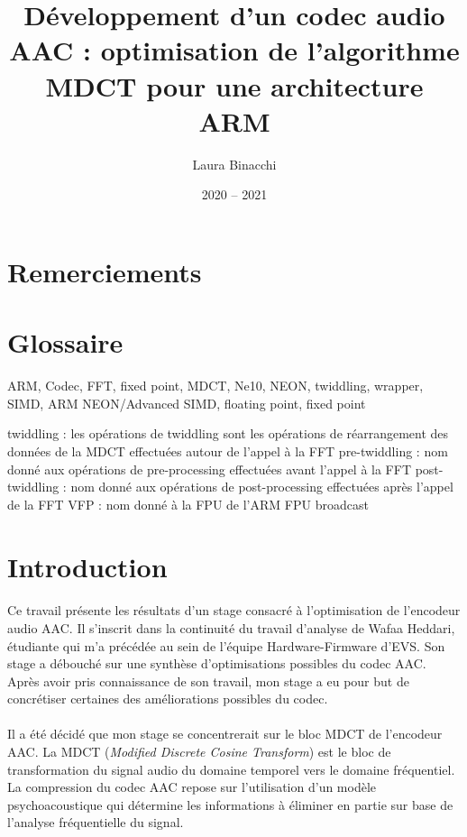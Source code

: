 \documentclass{article}
\title{Développement d'un codec audio AAC : optimisation de l'algorithme MDCT pour une architecture ARM}
\date{2020 -- 2021}
\author{Laura Binacchi}
\begin{document}
    
    \newpage
    \section*{Remerciements}



    \newpage
    \tableofcontents
    \newpage
    \listoffigures


    \newpage
    \section*{Glossaire}
    ARM, Codec, FFT, fixed point, MDCT, Ne10, NEON, twiddling, wrapper, SIMD, ARM NEON/Advanced SIMD, floating point, fixed point

    twiddling : les opérations de twiddling sont les opérations de réarrangement des données de la MDCT effectuées autour de l'appel à la FFT
    pre-twiddling : nom donné aux opérations de pre-processing effectuées avant l'appel à la FFT
    post-twiddling : nom donné aux opérations de post-processing effectuées après l'appel de la FFT
    VFP : nom donné à la FPU de l'ARM
    FPU
    broadcast

    \newpage
    \section*{Introduction}

    \paragraph{}
    Ce travail présente les résultats d'un stage consacré à l'optimisation de l'encodeur audio AAC. Il s'inscrit dans la continuité du travail d'analyse de Wafaa Heddari, étudiante qui m'a précédée au sein de l'équipe Hardware-Firmware d'EVS. Son stage a débouché sur une synthèse d'optimisations possibles du codec AAC. Après avoir pris connaissance de son travail, mon stage a eu pour but de concrétiser certaines des améliorations possibles du codec.

    \paragraph{}
    Il a été décidé que mon stage se concentrerait sur le bloc MDCT de l'encodeur AAC. La MDCT (\emph{Modified Discrete Cosine Transform}) est le bloc de transformation du signal audio du domaine temporel vers le domaine fréquentiel. La compression du codec AAC repose sur l'utilisation d'un modèle psychoacoustique qui détermine les informations à éliminer en partie sur base de l'analyse fréquentielle du signal.
\end{document}
